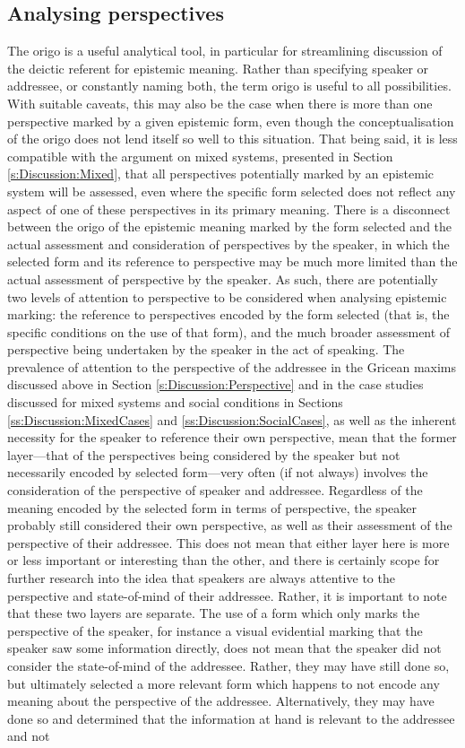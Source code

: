 \subsection{Analysing perspectives}
The origo is a useful analytical tool, in particular for streamlining discussion of the deictic referent for epistemic meaning. Rather than specifying speaker or addressee, or constantly naming both, the term origo is useful to all possibilities. With suitable caveats, this may also be the case when there is more than one perspective marked by a given epistemic form, even though the conceptualisation of the origo does not lend itself so well to this situation. That being said, it is less compatible with the argument on mixed systems, presented in Section \ref{s:Discussion:Mixed}, that all perspectives potentially marked by an epistemic system will be assessed, even where the specific form selected does not reflect any aspect of one of these perspectives in its primary meaning. There is a disconnect between the origo of the epistemic meaning marked by the form selected and the actual assessment and consideration of perspectives by the speaker, in which the selected form and its reference to perspective may be much more limited than the actual assessment of perspective by the speaker. As such, there are potentially two levels of attention to perspective to be considered when analysing epistemic marking: the reference to perspectives encoded by the form selected (that is, the specific conditions on the use of that form), and the much broader assessment of perspective being undertaken by the speaker in the act of speaking. The prevalence of attention to the perspective of the addressee in the Gricean maxims discussed above in Section \ref{s:Discussion:Perspective} and in the case studies discussed for mixed systems and social conditions in Sections \ref{ss:Discussion:MixedCases} and \ref{ss:Discussion:SocialCases}, as well as the inherent necessity for the speaker to reference their own perspective, mean that the former layer---that of the perspectives being considered by the speaker but not necessarily encoded by selected form---very often (if not always) involves the consideration of the perspective of speaker and addressee. Regardless of the meaning encoded by the selected form in terms of perspective, the speaker probably still considered their own perspective, as well as their assessment of the perspective of their addressee. This does not mean that either layer here is more or less important or interesting than the other, and there is certainly scope for further research into the idea that speakers are always attentive to the perspective and state-of-mind of their addressee. Rather, it is important to note that these two layers are separate. The use of a form which only marks the perspective of the speaker, for instance a visual evidential marking that the speaker saw some information directly, does not mean that the speaker did not consider the state-of-mind of the addressee. Rather, they may have still done so, but ultimately selected a more relevant form which happens to not encode any meaning about the perspective of the addressee. Alternatively, they may have done so and determined that the information at hand is relevant to the addressee and not 